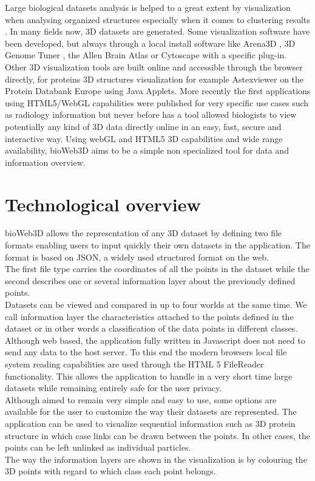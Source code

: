 \documentclass{bioinfo}
\begin{document}
Large biological datasets analysis is helped to a great extent by visualization when analysing organized structures especially when it comes to clustering results \citep{Rubel10}. In many fields now, 3D datasets are generated. Some visualization software have been developed, but always through a local install software like Arena3D \citep{Pavlopoulos08},  3D Genome Tuner \citep{Wang09}, the Allen Brain Atlas \citep{Lein07} or Cytoscape \citep{Shannon03} with a specific plug-in. Other 3D visualization tools are built online and accessible through the browser directly, for proteins 3D structures visualization for example Astexviewer \citep{Hartshorn02} on the Protein Databank Europe using Java Applets. More recently the first applications using HTML5/WebGL capabilities were published for very specific use cases such as radiology information \citep{Dinesh12} but never before has a tool allowed biologists to view potentially any kind of 3D data directly online in an easy, fast, secure and interactive way. Using webGL and HTML5 3D capabilities and wide range availability, bioWeb3D aims to be a simple non specialized tool for data and information overview.



\section{Technological overview}

bioWeb3D allows the representation of any 3D dataset by defining two file formats enabling users to input quickly their own datasets in the application. The format is based on JSON, a widely used structured format on the web.\\
The first file type carries the coordinates of all the points in the dataset while the second describes one or several information layer about the previously defined points.\\
Datasets can be viewed and compared in up to four worlds at the same time. We call information layer the characteristics attached to the points defined in the dataset or in other words a classification of the data points in different classes.  Although web based, the application fully written in Javascript does not need to send any data to the host server. To this end the modern browsers local file system reading capabilities are used through the HTML 5 FileReader functionality. This allows the application to handle in a very short time large datasets while remaining entirely safe for the user privacy. \\
Although aimed to remain very simple and easy to use, some options are available for the user to customize the way their datasets are represented. The application can be used to visualize sequential information such as 3D protein structure in which case links can be drawn between the points. In other cases, the points can be left unlinked as individual particles. \\
The way the information layers are shown in the visualization is by colouring the 3D points with regard to which class each point belongs.\\
\end{document}
